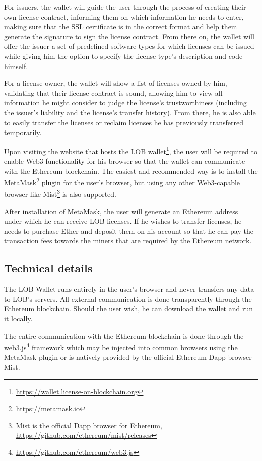 \documentclass[a4paper]{article}
\begin{document}
For issuers, the wallet will guide the user through the process of creating their own license contract, informing them on which information he needs to enter, making sure that the SSL certificate is in the correct format and help them generate the signature to sign the license contract. From there on, the wallet will offer the issuer a set of predefined software types for which licenses can be issued while giving him the option to specify the license type's description and code himself.

For a license owner, the wallet will show a list of licenses owned by him, validating that their license contract is sound, allowing him to view all information he might consider to judge the license's trustworthiness (including the issuer's liability and the license's transfer history). From there, he is also able to easily transfer the licenses or reclaim licenses he has previously transferred temporarily.

Upon visiting the website that hosts the LOB wallet\footnote{\url{https://wallet.license-on-blockchain.org}}, the user will be required to enable Web3 functionality for his browser so that the wallet can communicate with the Ethereum blockchain. The easiest and recommended way is to install the MetaMask\footnote{\url{https://metamask.io}} plugin for the user's browser, but using any other Web3-capable browser like Mist\footnote{Mist is the official Dapp browser for Ethereum, \url{https://github.com/ethereum/mist/releases}} is also supported.

After installation of MetaMask, the user will generate an Ethereum address under which he can receive LOB licenses. If he wishes to transfer licenses, he needs to purchase Ether and deposit them on his account so that he can pay the transaction fees towards the miners that are required by the Ethereum network.

\subsection{Technical details}

The LOB Wallet runs entirely in the user's browser and never transfers any data to LOB's servers. All external communication is done transparently through the Ethereum blockchain. Should the user wish, he can download the wallet and run it locally.

The entire communication with the Ethereum blockchain is done through the web3.js\footnote{\url{https://github.com/ethereum/web3.js}} framework which may be injected into common browsers using the MetaMask plugin or is natively provided by the official Ethereum Dapp browser Mist.
\end{document}
